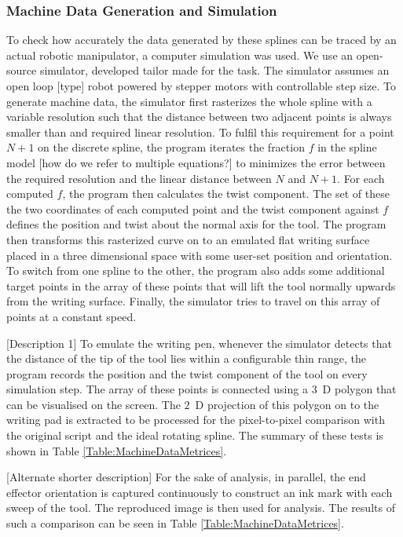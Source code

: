 \subsubsection{Machine Data Generation and Simulation}
    To check how accurately the data generated by these splines can be traced by an actual robotic manipulator, a computer simulation was used. We use an open-source simulator, developed  tailor made for the task. The simulator assumes an open loop [type] robot powered by stepper motors with controllable step size. To generate machine data, the simulator first rasterizes the whole spline with a variable resolution such that the distance between two adjacent points is always smaller than and required linear resolution. To fulfil this requirement for a point $N + 1$ on the discrete spline, the program iterates the fraction $f$ in the spline model [how do we refer to multiple equations?] to minimizes the error between the required resolution and the linear distance between $N$ and $N + 1$. For each computed $f$, the program then calculates the twist component. The set of these the two coordinates of each computed point and the twist component against $f$ defines the position and twist about the normal axis for the tool. The program then transforms this rasterized curve on to an emulated flat writing surface placed in a three dimensional space with some user-set position and orientation. To switch from one spline to the other, the program also adds some additional target points in the array of these points that will lift the tool normally upwards from the writing surface. Finally, the simulator tries to travel on this array of points at a constant speed. 
    
    [Description 1]
    To emulate the writing pen, whenever the simulator detects that the distance of the tip of the tool lies within a configurable thin range, the program records the position and the twist component of the tool on every simulation step. The array of these points is connected using a $3$~D polygon that can be visualised on the screen. The $2$~D projection of this polygon on to the writing pad is extracted to be processed for the pixel-to-pixel comparison with the original script and the ideal rotating spline. The summary of these tests is shown in Table \ref{Table:MachineDataMetrices}.

    [Alternate shorter description]
    For the sake of analysis, in parallel, the end effector orientation is captured continuously to construct an ink mark with each sweep of the tool. The reproduced image is then used for analysis. The results of such a comparison can be seen in Table \ref{Table:MachineDataMetrices}.

